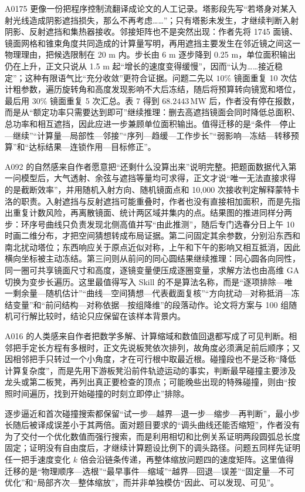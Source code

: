A0175 更像一份把程序控制流翻译成论文的人工记录。塔影段先写“若塔身对某入射光线造成阴影遮挡损失，那么不再考虑……”；只有塔影未发生，才继续判断入射阴影、反射遮挡和集热器接收。邻接矩阵也不是突然出现：作者先将 1745 面镜、镜面网格和锥束角度共同造成的计算量写明，再用遮挡主要发生在邻近镜之间这一物理理由，把候选限制在 20 m 内。步长由 6 m 逐步降到 0.25 m，单位面积输出仍在上升，正文只说从 1.5 m 起“增长的速度变得缓慢”，因而“认为……接近稳定”；这种有限语气比“充分收敛”更符合证据。问题二先以 $10\%$ 镜面重复 10 次估计粗参数，遍历旋转角和高度发现影响不大后冻结，随后将预算转向镜宽和塔位，最后用 $30\%$ 镜面重复 5 次汇总。表 7 得到 $68.2443\,\mathrm{MW}$ 后，作者没有停在报数，而是从“额定功率只需要达到即可”继续推理：删去高遮挡镜面会同时降低总面积、总功率和相互遮挡，因此应进一步兼顾单位面积输出。值得迁移的是“条件—停止—继续”“计算量—局部性—邻接”“序列—趋缓—工作步长”“弱影响—冻结—转移预算”和“达标结果—连锁作用—目标修正”。

A092 的自然感来自作者愿意把“还剩什么没算出来”说明完整。把题面数据代入第一问模型后，大气透射、余弦与遮挡等量均可求得，正文才说“唯一无法直接求得的是截断效率”，并用随机入射方向、随机镜面点和 10,000 次接收判定解释蒙特卡洛的职责。入射遮挡与反射遮挡可能重叠时，作者也没有直接相加面积，而是先指出重复计数风险，再离散镜面、统计两区域并集内的点。结果图的推进同样分两步：环序号曲线只负责发现北侧高值并写“由此推测”，随后专门选春分日上午 10 时画二维分布，才把空间猜想转成布局证据。第二问固定其余参数，分别沿东西和南北扰动塔位；东西响应关于原点近似对称，上午和下午的影响又相互抵消，因此横向坐标被主动冻结。第三问则从前问的同心圆结果继续推理：同心圆各向同性，同一圈可共享镜面尺寸和高度，逐镜变量便压成逐圈变量，求解方法也由高维 GA 切换为变步长遍历。这里最值得写入 Skill 的不是算法名称，而是“逐项排除—唯一剩余量—随机估计”“曲线—空间猜想—代表截面复核”“方向扰动—对称抵消—冻结变量”和“前问结构—对称依据—按组降维”的段落动作。论文将方案与 100 组随机可行解比较时，结论只应保留在该样本背景内。

A016 的人类感来自作者把数学多解、计算缩域和数值回退都写成了可见判断。相邻把手定长方程有多根时，正文先说板凳依次排列，故角度必须满足前后顺序；又因相邻把手只转过一个小角度，才在可行根中取最近根。碰撞段也不是泛称“降低计算复杂度”，而是先用下游板凳沿前件轨迹运动的事实，判断最早碰撞主要涉及龙头或第二板凳，再列出真正要检查的顶点；可能晚些出现的特殊碰撞，则由“按照时间遍历，找到开始碰撞的时刻立即停止”排除。

逐步逼近和首次碰撞搜索都保留“试一步—越界—退一步—缩步—再判断”，最小步长随后被译成误差小于其两倍。面对题目要求的“调头曲线还能否缩短”，作者没有为了交付一个优化数值而强行搜索，而是利用相切和比例关系证明两段圆弧总长度固定；证明没有自由度后，才继续计算题设比例下的调头路径。问题五同样先证明任一把手速度变化 $k$ 倍会沿链条传递，再整体缩放问题四的速度矩阵。这里值得迁移的是“物理顺序—选根”“最早事件—缩域”“越界—回退—误差”“固定量—不可优化”和“局部齐次—整体缩放”，而并非单独模仿“因此、可以发现、可见”。

